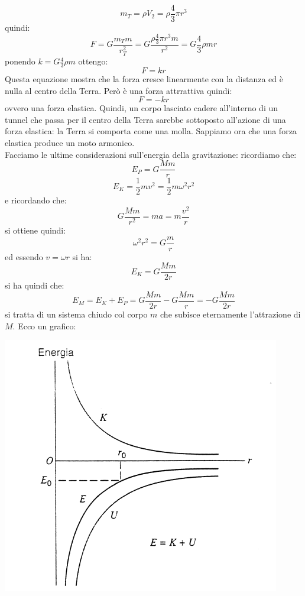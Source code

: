 \documentclass[a4paper,12pt, oneside]{book}
\begin{document}
$$m_T=\rho V_2=\rho\frac{4}{3}\pi r^3$$
quindi:
$$F=G\frac{m_Tm}{r_T^2}=G\frac{\rho\frac{4}{3}\pi r^3 m}{r^2}=G\frac{4}{3}\rho m r$$
ponendo $k=G\frac{4}{3}\rho m $ ottengo:
$$F=kr$$
Questa equazione mostra che la forza  cresce linearmente con la distanza ed è nulla al centro della Terra. Però è una forza attrrattiva quindi:
$$F=-kr$$
ovvero una forza elastica. Quindi, un corpo lasciato cadere all'interno di un tunnel che passa  per il centro della Terra sarebbe sottoposto all'azione di una forza  elastica: la Terra si comporta come una molla. Sappiamo ora che una  forza elastica produce un moto armonico.\\
Facciamo le ultime considerazioni sull'energia della gravitazione:
ricordiamo che:
$$E_P=G\frac{Mm}{r}$$
$$E_K=\frac{1}{2}mv^2=\frac{1}{2}m\omega^2r^2$$
e ricordando che:
$$G\frac{Mm}{r^2}=ma=m\frac{v^2}{r}$$
si ottiene quindi:
$$\omega^2r^2=G\frac{m}{r}$$
ed essendo $v=\omega r$ si ha:
$$E_K=G\frac{Mm}{2r}$$
si ha quindi che:
$$E_M=E_K+E_P=G\frac{Mm}{2r}-G\frac{Mm}{r}=-G\frac{Mm}{2r}$$
si tratta di un sistema chiudo col corpo $m$ che subisce eternamente l'attrazione di $M$. Ecco un grafico:
\begin{center}
\includegraphics[scale=0.5]{img/grav.png}
\end{center}
\end{document}
